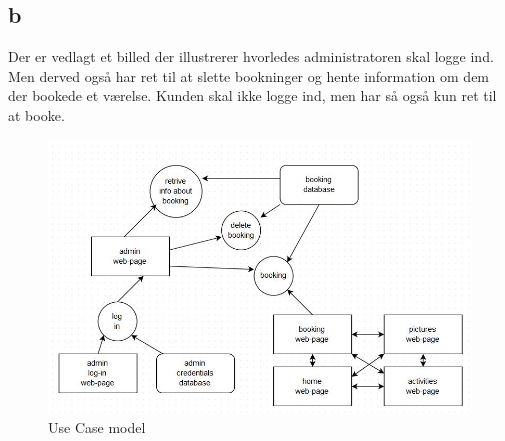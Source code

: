 \documentclass[12pt,a4paper]{article}
\begin{document}
\subsection{b}
Der er vedlagt et billed der illustrerer hvorledes administratoren skal logge ind. Men derved også har ret til at slette bookninger og hente information om dem der bookede et værelse. Kunden skal ikke logge ind, men har så også kun ret til at booke.\\ 
\begin{figure}[H]
\includegraphics[scale=0.7]{useCaseModel.jpg}
\caption{Use Case model}
\end{figure}
\end{document}

